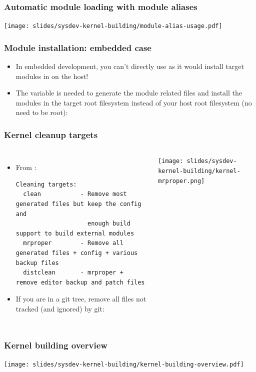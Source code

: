 \begin{frame}
  \frametitle{Automatic module loading with module aliases}
  \texttt{[image: slides/sysdev-kernel-building/module-alias-usage.pdf]}
\end{frame}

\begin{frame}
  \frametitle{Module installation: embedded case}
  \begin{itemize}
  \item In embedded development, you can't directly use
     as it would install target modules
    in  on the host!
  \item The  variable is needed to generate
    the module related files and install the modules in the target
    root filesystem instead of your host root filesystem (no need
    to be root):\\
  \end{itemize}
\end{frame}

\begin{frame}[fragile]
  \frametitle{Kernel cleanup targets}
  \begin{columns}
    \small
    \begin{itemize}
    \item From :
    \begin{block}{}
    \begin{verbatim}
Cleaning targets:
  clean           - Remove most generated files but keep the config and
                    enough build support to build external modules
  mrproper        - Remove all generated files + config + various backup files
  distclean       - mrproper + remove editor backup and patch files
     \end{verbatim}
     \end{block}
    \item If you are in a git tree, remove all files not tracked (and
      ignored) by git:\\
    \end{itemize}
    \texttt{[image: slides/sysdev-kernel-building/kernel-mrproper.png]}
  \end{columns}
\end{frame}

\begin{frame}
  \frametitle{Kernel building overview}
  \begin{center}
    \texttt{[image: slides/sysdev-kernel-building/kernel-building-overview.pdf]}
  \end{center}
\end{frame}

